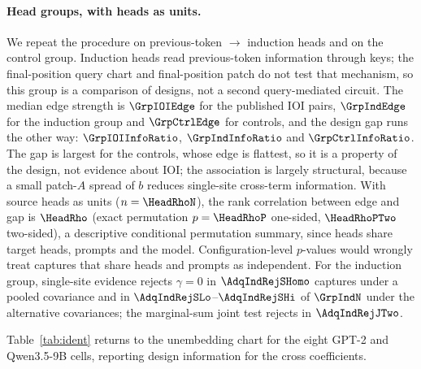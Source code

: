 \paragraph{Head groups, with heads as units.} We repeat the procedure on previous-token $\to$ induction heads and on
the control group. Induction heads read previous-token information through keys; the final-position query chart and final-position patch do not test that
mechanism, so this group is a comparison of designs, not a second query-mediated circuit. The median edge strength is $\GrpIOIEdge$ for the published IOI pairs, $\GrpIndEdge$ for the
induction group and $\GrpCtrlEdge$ for controls, and the design gap runs the other way: $\GrpIOIInfoRatio$,
$\GrpIndInfoRatio$ and $\GrpCtrlInfoRatio$. The gap is largest for the controls, whose edge is flattest, so it is a
property of the design, not evidence about IOI; the association is largely structural, because a small patch-$A$
spread of $b$ reduces single-site cross-term information. With source heads as units ($n=\HeadRhoN$), the rank
correlation between edge and gap is $\HeadRho$ (exact permutation $p=\HeadRhoP$ one-sided, $\HeadRhoPTwo$ two-sided), a
descriptive conditional permutation summary, since heads share target heads, prompts and the model. Configuration-level
$p$-values would wrongly treat captures that share heads and prompts as independent. For the induction group,
single-site evidence rejects $\gamma=0$ in $\AdqIndRejSHomo$ captures under a pooled covariance and in
$\AdqIndRejSLo$--$\AdqIndRejSHi$ of $\GrpIndN$ under the alternative covariances; the marginal-sum joint test rejects in
$\AdqIndRejJTwo$. 

Table~\ref{tab:ident} returns to the unembedding chart for the eight GPT-2 and Qwen3.5-9B cells,
reporting design information for the cross coefficients.

